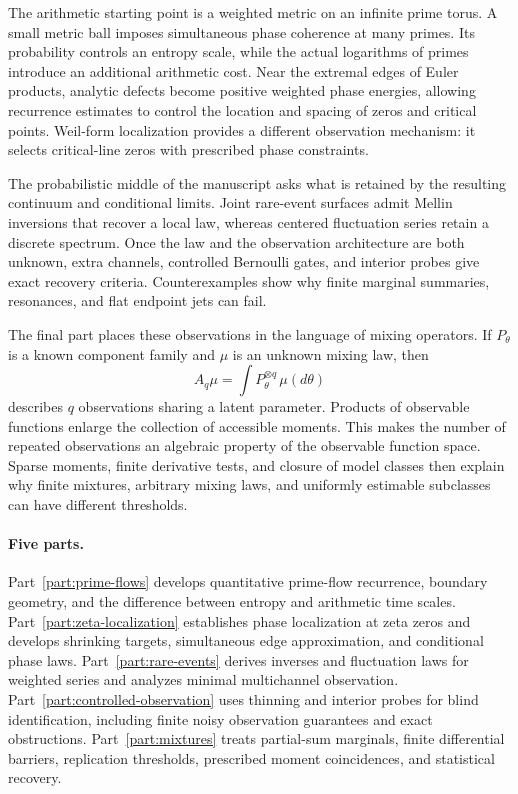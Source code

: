 \documentclass[11pt,letterpaper]{article}
\theoremstyle{definition}
\theoremstyle{remark}
\newcommand{\1}{\mathbf 1}
\begin{document}
The arithmetic starting point is a weighted metric on an infinite
prime torus. A small metric ball imposes simultaneous phase coherence
at many primes. Its probability controls an entropy scale, while the
actual logarithms of primes introduce an additional arithmetic cost.
Near the extremal edges of Euler products, analytic defects become
positive weighted phase energies, allowing recurrence estimates to
control the location and spacing of zeros and critical points.
Weil-form localization provides a different observation mechanism:
it selects critical-line zeros with prescribed phase constraints.

The probabilistic middle of the manuscript asks what is retained by
the resulting continuum and conditional limits. Joint rare-event
surfaces admit Mellin inversions that recover a local law, whereas
centered fluctuation series retain a discrete spectrum. Once the law
and the observation architecture are both unknown, extra channels,
controlled Bernoulli gates, and interior probes give exact recovery
criteria. Counterexamples show why finite marginal summaries,
resonances, and flat endpoint jets can fail.

The final part places these observations in the language of mixing
operators. If $P_\theta$ is a known component family and $\mu$ is an
unknown mixing law, then
\[
 A_q\mu=\int P_\theta^{\otimes q}\,\mu(d\theta)
\]
describes $q$ observations sharing a latent parameter. Products of
observable functions enlarge the collection of accessible moments.
This makes the number of repeated observations an algebraic property
of the observable function space. Sparse moments, finite derivative
tests, and closure of model classes then explain why finite mixtures,
arbitrary mixing laws, and uniformly estimable subclasses can have
different thresholds.

\paragraph{Five parts.}
Part~\ref{part:prime-flows} develops quantitative prime-flow recurrence,
boundary geometry, and the difference between entropy and arithmetic
time scales. Part~\ref{part:zeta-localization} establishes phase
localization at zeta zeros and develops shrinking targets, simultaneous
edge approximation, and conditional phase laws. Part~\ref{part:rare-events}
derives inverses and fluctuation laws for weighted series and analyzes
minimal multichannel observation. Part~\ref{part:controlled-observation}
uses thinning and interior probes for blind identification, including
finite noisy observation guarantees and exact obstructions.
Part~\ref{part:mixtures} treats partial-sum marginals, finite differential
barriers, replication thresholds, prescribed moment coincidences,
and statistical recovery.
\end{document}
